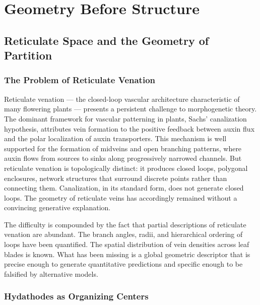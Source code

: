 \documentclass[12pt, a4paper, openany]{book}
\theoremstyle{definition}
\theoremstyle{remark}
\begin{document}

\part{Geometry Before Structure}


\chapter{Reticulate Space and the Geometry of Partition}

\section{The Problem of Reticulate Venation}

Reticulate venation — the closed-loop vascular architecture characteristic of many flowering plants — presents a persistent challenge to morphogenetic theory. The dominant framework for vascular patterning in plants, Sachs' canalization hypothesis, attributes vein formation to the positive feedback between auxin flux and the polar localization of auxin transporters. This mechanism is well supported for the formation of midveins and open branching patterns, where auxin flows from sources to sinks along progressively narrowed channels. But reticulate venation is topologically distinct: it produces closed loops, polygonal enclosures, network structures that surround discrete points rather than connecting them. Canalization, in its standard form, does not generate closed loops. The geometry of reticulate veins has accordingly remained without a convincing generative explanation.

The difficulty is compounded by the fact that partial descriptions of reticulate venation are abundant. The branch angles, radii, and hierarchical ordering of loops have been quantified. The spatial distribution of vein densities across leaf blades is known. What has been missing is a global geometric descriptor that is precise enough to generate quantitative predictions and specific enough to be falsified by alternative models.

\section{Hydathodes as Organizing Centers}
\end{document}
